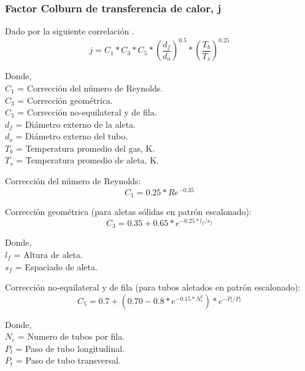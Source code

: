 \subsubsection{Factor Colburn de transferencia de calor, j}
\par Dado por la siguiente correlación \cite{bib:colburn}.
\begin{equation}
j = C_1 *C_3 *C_5 *(\dfrac{d_f}{d_o})^{0.5} *(\frac{T_b}{T_s})^{0.25}
\end{equation}
\par Donde, \\
$C_1$ = Corrección del número de Reynolds. \\
$C_3$ = Corrección geométrica. \\
$C_5$ = Corrección no-equilateral y de fila. \\
$d_f$ = Diámetro externo de la aleta. \\
$d_o$ = Diámetro externo del tubo. \\
$T_b$ = Temperatura promedio del gas, K. \\
$T_s$ = Temperatura promedio de aleta, K.
\par Corrección del número de Reynolds:
\begin{equation}
C_1 = 0.25 *Re^{-0.35}
\end{equation}
\par Corrección geométrica (para aletas sólidas en patrón escalonado):
\begin{equation}
C_3 = 0.35 +0.65 *e^{-0.25*l_f/s_f}
\end{equation}
\par Donde, \\
$l_f$ = Altura de aleta. \\
$s_f$ = Espaciado de aleta.
\par Corrección no-equilateral y de fila (para tubos aletados en patrón escalonado):
\begin{equation}
C_5 = 0.7 +(0.70 -0.8 *e^{-0.15 *N_r^2}) *e^{-P_l/P_t}
\end{equation}
\par Donde, \\
$N_r$ = Numero de tubos por fila. \\
$P_l$ = Paso de tubo longitudinal.\\
$P_t$ = Paso de tubo transversal. \\

